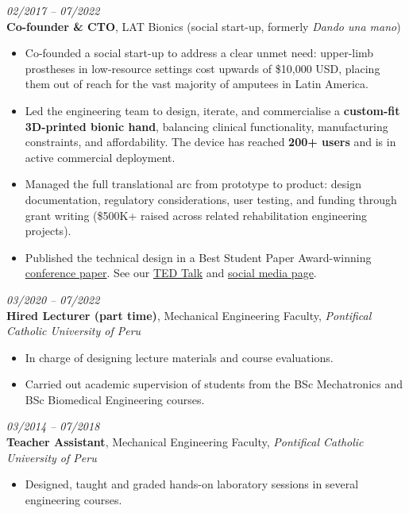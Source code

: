 \documentclass[a4paper,10pt]{article}
\newcommand{\cvdate}[1]{\textit{#1}}
\begin{document}
\vspace{4pt}
\cvdate{02/2017 -- 07/2022}\\
\textbf{Co-founder \& CTO}, LAT Bionics (social start-up, formerly \textit{Dando una mano})
\begin{itemize}
  \item Co-founded a social start-up to address a clear unmet need: upper-limb prostheses in
        low-resource settings cost upwards of \$10,000 USD, placing them out of reach for the
        vast majority of amputees in Latin America.
  \item Led the engineering team to design, iterate, and commercialise a \textbf{custom-fit
        3D-printed bionic hand}, balancing clinical functionality, manufacturing constraints,
        and affordability. The device has reached \textbf{200+ users} and is in active
        commercial deployment.
  \item Managed the full translational arc from prototype to product: design documentation,
        regulatory considerations, user testing, and funding through grant writing (\$500K+ raised across related
        rehabilitation engineering projects).
  \item Published the technical design in a Best Student Paper Award-winning \href{https://ieeexplore.ieee.org/document/8567461}{conference paper}.
        See our \href{https://www.ted.com/talks/enzo_romero_the_affordable_3d_printed_bionics_of_the_future}{TED Talk}
        and \href{https://www.instagram.com/latbionics/}{social media page}.
\end{itemize}

\vspace{4pt}
\cvdate{03/2020 -- 07/2022}\\
\textbf{Hired Lecturer (part time)}, Mechanical Engineering Faculty,
\textit{Pontifical Catholic University of Peru}
\begin{itemize}
  \item In charge of designing lecture materials and course evaluations.
  \item Carried out academic supervision of students from the BSc Mechatronics and BSc Biomedical
        Engineering courses.
\end{itemize}

\vspace{4pt}
\cvdate{03/2014 -- 07/2018}\\
\textbf{Teacher Assistant}, Mechanical Engineering Faculty,
\textit{Pontifical Catholic University of Peru}
\begin{itemize}
  \item Designed, taught and graded hands-on laboratory sessions in several engineering courses.
\end{itemize}
\end{document}

